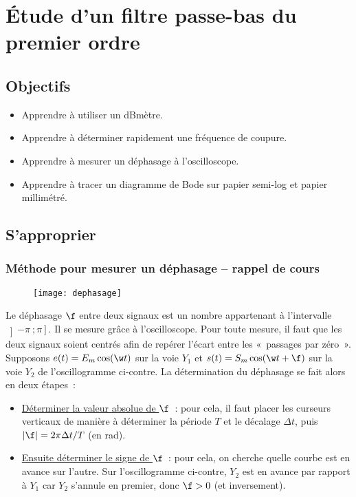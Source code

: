 \documentclass[a4paper, 11pt, final, garamond]{book}
\begin{document}
\setcounter{chapter}{12}

\chapter{\'Etude d'un filtre passe-bas du premier ordre}
\section{Objectifs}

\begin{itemize}
    \item Apprendre à utiliser un dBmètre.
    \item Apprendre à déterminer rapidement une fréquence de coupure.
    \item Apprendre à mesurer un déphasage à l'oscilloscope.
    \item Apprendre à tracer un diagramme de Bode sur papier semi-log et
        papier millimétré.
\end{itemize}

\section{S'approprier}

\subsection{Méthode pour mesurer un déphasage -- rappel de cours}

\begin{wrapfigure}[16]{r}{0.45\textwidth}
\vspace{-20pt}
    \begin{center}
        \texttt{[image: dephasage]}
    \end{center}
\vspace{-30pt}
\end{wrapfigure}

Le déphasage $\f$ entre deux signaux est un nombre appartenant à l'intervalle
$\left]-\pi~; \pi\right]$. Il se mesure grâce à l'oscilloscope. Pour toute
mesure, il faut que les deux signaux soient centrés afin de repérer l'écart
entre les «~passages par zéro~». Supposons $e(t) = E_{m} \cos(\w t)$ sur la voie
$Y_1$ et $s(t) = S_{m} \cos (\w t + \f)$ sur la voie $Y_2$ de l'oscillogramme
ci-contre. La détermination du déphasage se fait alors en deux étapes~:

\begin{itemize}
    \item \ul{Déterminer la valeur absolue de $\f$}~: pour cela, il faut placer
        les curseurs verticaux de manière à déterminer la période $T$ et le
        décalage $\Delta t$, puis $\left| \f \right| = 2 \pi \Delta t/T$ (en
        rad).
    \item \ul{Ensuite déterminer le signe de $\f$}~:
        pour cela, on cherche quelle courbe est en avance sur l'autre. Sur
        l'oscillogramme ci-contre, $Y_2$ est en avance par rapport à $Y_1$ car
        $Y_2$ s'annule en premier, donc $\f > 0$ (et inversement).
\end{itemize}
\end{document}
